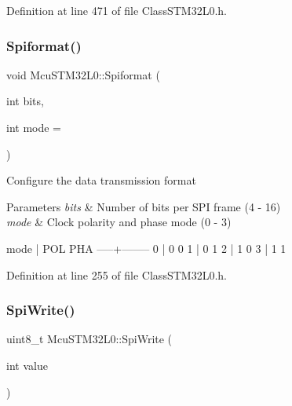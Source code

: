 Definition at line 471 of file Class\+S\+T\+M32\+L0.\+h.

\mbox{\label{class_mcu_s_t_m32_l0_a466bd56cae23756c3bfdac88bf0b3ff6}} 
\subsubsection{\texorpdfstring{Spiformat()}{Spiformat()}}
{\footnotesize\ttfamily void Mcu\+S\+T\+M32\+L0\+::\+Spiformat (\begin{DoxyParamCaption}\item[{int}]{bits,  }\item[{int}]{mode = {} }\end{DoxyParamCaption})\hspace{0.3cm}{\ttfamily [inline]}}

Configure the data transmission format


\begin{DoxyParams}{Parameters}
{\em bits} & Number of bits per S\+PI frame (4 -\/ 16) \\
\hline
{\em mode} & Clock polarity and phase mode (0 -\/ 3)\\
\hline
\end{DoxyParams}

\begin{DoxyCode}
mode | POL PHA
-----+--------
  0  |  0   0
  1  |  0   1
  2  |  1   0
  3  |  1   1
\end{DoxyCode}
 

Definition at line 255 of file Class\+S\+T\+M32\+L0.\+h.

\mbox{\label{class_mcu_s_t_m32_l0_abd95f830753fd74d9d15b5a441c799dd}} 
\subsubsection{\texorpdfstring{Spi\+Write()}{SpiWrite()}}
{\footnotesize\ttfamily uint8\+\_\+t Mcu\+S\+T\+M32\+L0\+::\+Spi\+Write (\begin{DoxyParamCaption}\item[{int}]{value }\end{DoxyParamCaption})\hspace{0.3cm}{\ttfamily [inline]}}

